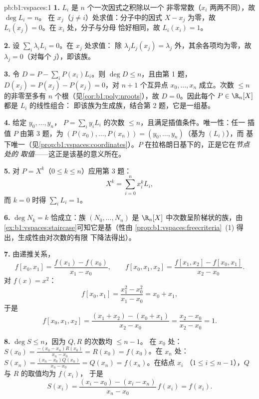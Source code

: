 \begin{solution}{pb:b1:vspaces:1}
\textbf{1.} $L_i$ 是 $n$ 个一次因式之积除以一个
非零常数（$x_i$ 两两不同），故 $\deg L_i = n$。
在 $x_j$（$j \neq i$）处求值：分子中的因式 $X - x_j$
为零，故 $L_i(x_j) = 0$。在 $x_i$ 处，分子与分母
恰好相同，故 $L_i(x_i) = 1$。

\textbf{2.} 设 $\sum_i \lambda_i L_i = 0$。在 $x_j$ 处求值：
除 $\lambda_j L_j(x_j) = \lambda_j$ 外，其余各项均为零，故
$\lambda_j = 0$（对每个 $j$），即该族。

\textbf{3.} 令 $D = P - \sum_i P(x_i) L_i$。则 $\deg D \leq n$，且由第 1 题，
$D(x_j) = P(x_j) - P(x_j) = 0$，对 $n + 1$
个互异点 $x_0, \dots, x_n$ 成立。次数
$\leq n$ 的非零至多有 $n$ 个根（见\cref{cor:b1:poly:nroots}），故 $D
= 0$。因此每个 $P \in \R_n[X]$ 都是 $L_i$ 的线性组合：
即该族为生成族，结合第 2 题，它是一组基。

\textbf{4.} 给定 $y_0, \dots, y_n$， $P = \sum_i
y_i L_i$ 的次数 $\leq n$，且满足插值条件。唯一性：任一
插值 $P$ 由第 3 题，为 $(P(x_0), \dots,
P(x_n)) = (y_0, \dots, y_n)$（基为 $(L_i)$），而
基下唯一（见\cref{prop:b1:vspaces:coordinates}）。$P$
在拉格朗日基下的，正是它在\emph{节点处的
取值}——这正是该基的意义所在。

\textbf{5.} 对 $P = X^k$（$0 \leq k \leq n$）应用第 3 题：
\[
X^k = \sum_{i=0}^{n} x_i^{k} L_i ,
\]
而 $k = 0$ 时得 $\sum_i L_i = 1$。

\textbf{6.} $\deg N_k = k$ 恰成立：族 $(N_0, \dots, N_n)$
是 $\R_n[X]$ 中次数呈阶梯状的族，由
\cref{ex:b1:vspaces:staircase}可知它是基（性由
\cref{prop:b1:vspaces:freecriteria}~(1) 得出，生成性由对次数的有限
下降法得出）。

\textbf{7.} 由递推关系，
\[
f[x_0, x_1] = \frac{f(x_1) - f(x_0)}{x_1 - x_0},
\qquad
f[x_0, x_1, x_2] = \frac{f[x_1, x_2] - f[x_0, x_1]}{x_2 - x_0}.
\]
对 $f(x) = x^2$：
\[
f[x_0, x_1] = \frac{x_1^2 - x_0^2}{x_1 - x_0} = x_0 + x_1,
\]
于是
\[
f[x_0, x_1, x_2]
= \frac{(x_1 + x_2) - (x_0 + x_1)}{x_2 - x_0}
= \frac{x_2 - x_0}{x_2 - x_0} = 1 .
\]

\textbf{8.} $\deg S \leq n$，因为 $Q, R$ 的次数均 $\leq n - 1$。
在 $x_0$ 处：$S(x_0) = \frac{-(x_0 - x_n) R(x_0)}{x_n - x_0} =
R(x_0) = f(x_0)$。在 $x_n$ 处：$S(x_n) = \frac{(x_n - x_0)
Q(x_n)}{x_n - x_0} = Q(x_n) = f(x_n)$。在结点 $x_i$
（$1 \leq i \leq n-1$），$Q$ 与 $R$ 的取值均为 $f(x_i)$，
于是
\[
S(x_i) = \frac{(x_i - x_0) - (x_i - x_n)}{x_n - x_0}\, f(x_i)
= f(x_i) .
\]


\end{solution}
